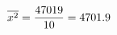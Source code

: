 \documentclass[preview]{standalone}
\begin{document}
\begin{align*}
\special{dvisvgm:raw <g id='unique000'>}\overline{x^2} = \frac{47019}{10} = 4701.9\special{dvisvgm:raw </g>}
\end{align*}
\end{document}
